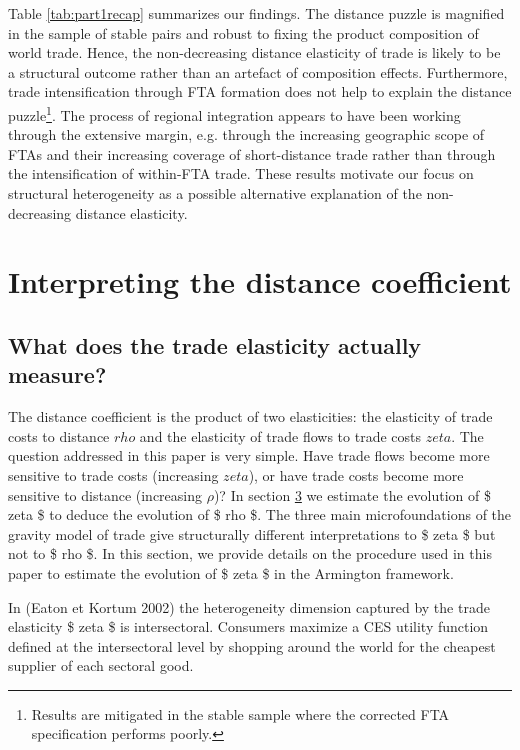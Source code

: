 \documentclass[12pt,twoside,a4paper,notitlepage]{article}
\newcommand{\revLA}[1]{\textcolor{red}{\footnotesize\textit{{revLA: #1}}}} %
\def\revLA #1{} %
\begin{document}
Table \ref{tab:part1recap} summarizes our findings. The distance puzzle is magnified in the sample of stable pairs and robust to fixing the product composition of world trade. Hence, the non-decreasing distance elasticity of trade is likely to be a structural outcome rather than an artefact of composition effects. 
Furthermore, trade intensification through FTA formation does not help to explain the distance puzzle\footnote{Results are mitigated in the stable sample where the corrected FTA specification performs poorly.}. The process of regional integration appears to have been working through the extensive margin, e.g. through the increasing geographic scope of FTAs and their increasing coverage of short-distance trade rather than through the intensification of within-FTA trade.
\fi
These results motivate our focus on structural heterogeneity as a possible alternative explanation of the non-decreasing distance elasticity. 

\clearpage
\revLA{I SUPPRESS ALL OF THE FOLLOWING PARTS UNTIL REFERENCES WHICH I UPDATED AS WELL}


\section{ Interpreting the distance coefficient}

\subsection{What does the trade elasticity actually measure? \label{mark-1.1.}}

The distance coefficient is the product of two elasticities: the elasticity of trade costs to distance $ rho $ and the elasticity of trade flows to trade costs $ zeta $. The question addressed in this paper is very simple. Have trade flows become more sensitive to trade costs (increasing $ zeta $), or have trade costs become more sensitive to distance (increasing $\rho$)? In section {\hyperref[ref-003]{3}} we estimate the evolution of \$ zeta \$ to deduce the evolution of \$ rho \$. The three main microfoundations of the gravity model of trade give structurally different interpretations to \$ zeta \$ but not to \$ rho \$. In this section, we provide details on the procedure used in this paper to estimate the evolution of \$ zeta \$ in the Armington framework. 

In (Eaton et Kortum 2002) the heterogeneity dimension captured by the trade elasticity \$ zeta \$ is intersectoral. Consumers maximize a CES utility function defined at the intersectoral level by shopping around the world for the cheapest supplier of each sectoral good.
\end{document}
